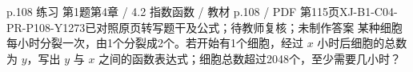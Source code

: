 \par\noindent\begin{minipage}{\linewidth}
\begin{bankitem}{p.108 练习 第1题}{第4章 / 4.2 指数函数 / 教材 p.108 / PDF 第115页}{XJ-B1-C04-PR-P108-Y1273}{已对照原页转写题干及公式；待教师复核；未制作答案}
某种细胞每小时分裂一次，由1个分裂成2个。若开始有1个细胞，经过 $x$ 小时后细胞的总数为 $y$，写出 $y$ 与 $x$ 之间的函数表达式；细胞总数超过2048个，至少需要几小时？
\end{bankitem}
\end{minipage}\par\medskip
